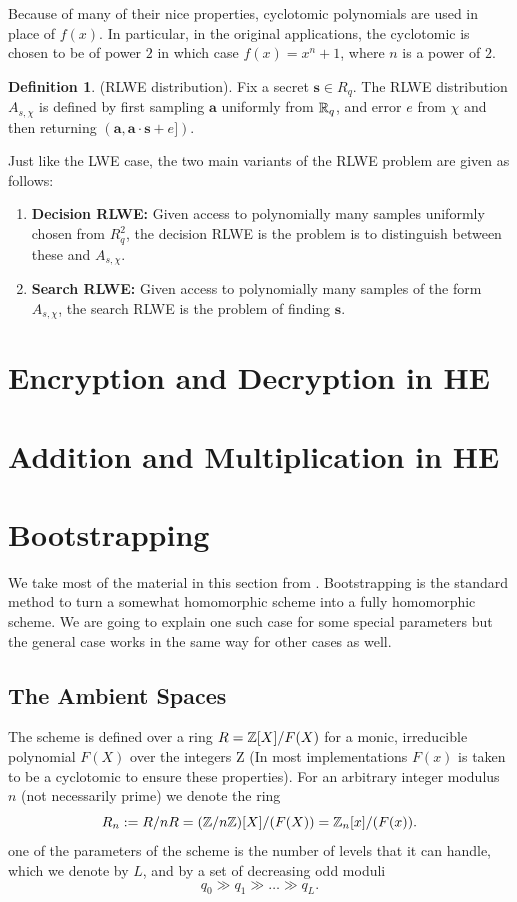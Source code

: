 \documentclass[12pt]{article}
\theoremstyle{plain}
\theoremstyle{definition}
\newtheorem{definition}{Definition}
\theoremstyle{remark}
\begin{document}
Because of many of their nice properties, cyclotomic polynomials are used in place of $f(x)$. In particular, in the original applications, the cyclotomic is chosen to be of power $2$ in which case $f(x)=x^n+1$, where $n$ is a power of $2$. 

\begin{definition}(RLWE distribution). Fix a secret $\mathbf{s}\in R_q$. The RLWE distribution $A_{s,\mathcal{\chi}}$ is defined by first sampling $\mathbf{a}$ uniformly from $\mathbb{R}_q$, and error $e$ from $\mathcal{\chi}$ and then returning
$(\mathbf{a}, \mathbf{a}\cdot \mathbf{s} + e])$.
\end{definition}

Just like the LWE case, the two main variants of the RLWE problem are given as follows:
\begin{enumerate}
    \item {\bf Decision RLWE:} Given access to polynomially many samples uniformly chosen from $R_q^2$, the decision RLWE is the problem is to distinguish between these and $A_{s,\mathcal{\chi}}$.  
    \item {\bf Search RLWE:} Given access to polynomially many samples of the form $A_{s,\mathcal{\chi}}$, the search RLWE is the problem of finding $\mathbf{s}$. 
    \end{enumerate}

\section{Encryption and Decryption in HE}
\section{Addition and Multiplication in HE}
\section{Bootstrapping}
We take most of the material in this section from \cite{bootstrap}. Bootstrapping is the standard method to turn a somewhat homomorphic scheme into a fully homomorphic scheme. We are going to explain one such case for some special parameters but the general case works in the same way for other cases as well.
\subsection{The Ambient Spaces}
The scheme is defined over a ring $R = \mathbb{Z}[X]/F(X)$ for a monic, irreducible polynomial $F(X)$ over the integers Z (In most implementations $F(x)$ is taken to be a cyclotomic to ensure these properties). For an arbitrary integer modulus $n$ (not necessarily prime) we denote the ring
$$R_n:= R/nR = (\mathbb{Z}/n\mathbb{Z})[X]/(F(X)) = \mathbb{Z}_n[x]/(F(x)).$$ one of the parameters of the scheme is the number of levels that it can handle, which we denote by $L$, and by a set of decreasing odd moduli
$$q_0\gg q_1\gg \dots \gg q_L.$$ 
\end{document}
